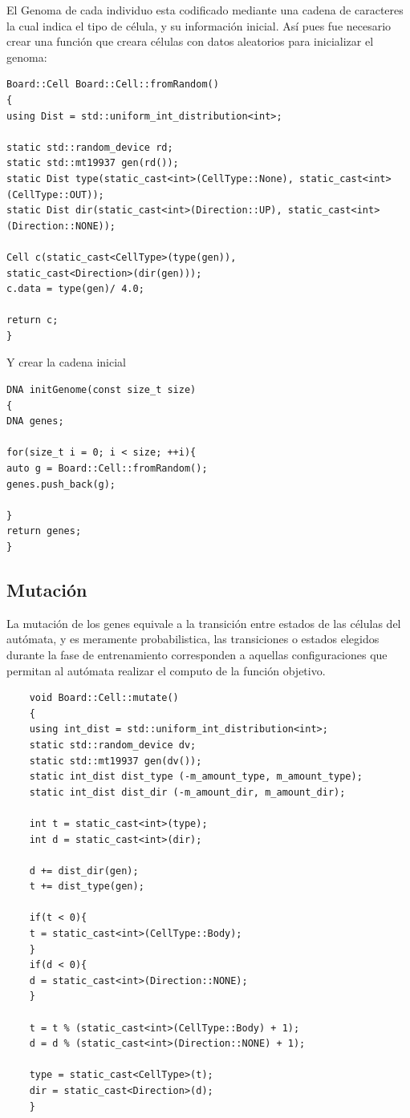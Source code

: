 \documentclass[]{article}
\begin{document}
El Genoma de cada individuo esta codificado mediante una cadena de caracteres la cual indica el tipo de célula,
y su información inicial. Así pues fue necesario crear una función que creara células con datos aleatorios
para inicializar el genoma:

\begin{verbatim}
Board::Cell Board::Cell::fromRandom()
{
using Dist = std::uniform_int_distribution<int>;

static std::random_device rd;
static std::mt19937 gen(rd());
static Dist type(static_cast<int>(CellType::None), static_cast<int>(CellType::OUT));
static Dist dir(static_cast<int>(Direction::UP), static_cast<int>(Direction::NONE));

Cell c(static_cast<CellType>(type(gen)),
static_cast<Direction>(dir(gen)));
c.data = type(gen)/ 4.0;

return c;
}
\end{verbatim}

Y crear la cadena inicial

\begin{verbatim}
DNA initGenome(const size_t size)
{
DNA genes;

for(size_t i = 0; i < size; ++i){
auto g = Board::Cell::fromRandom();
genes.push_back(g);

}
return genes;
}
\end{verbatim}

\subsection{Mutación}

La mutación de los genes equivale a la transición entre estados de las células del autómata, y es meramente probabilistica,
las transiciones o estados elegidos durante la fase  de entrenamiento corresponden a aquellas configuraciones
que permitan al autómata realizar el computo de la función objetivo.

\begin{verbatim}
	void Board::Cell::mutate()
	{
	using int_dist = std::uniform_int_distribution<int>;
	static std::random_device dv;
	static std::mt19937 gen(dv());
	static int_dist dist_type (-m_amount_type, m_amount_type);
	static int_dist dist_dir (-m_amount_dir, m_amount_dir);
	
	int t = static_cast<int>(type);
	int d = static_cast<int>(dir);
	
	d += dist_dir(gen);
	t += dist_type(gen);
	
	if(t < 0){
	t = static_cast<int>(CellType::Body);
	}
	if(d < 0){
	d = static_cast<int>(Direction::NONE);
	}
	
	t = t % (static_cast<int>(CellType::Body) + 1);
	d = d % (static_cast<int>(Direction::NONE) + 1);
	
	type = static_cast<CellType>(t);
	dir = static_cast<Direction>(d);
	}
\end{verbatim}
\end{document}
